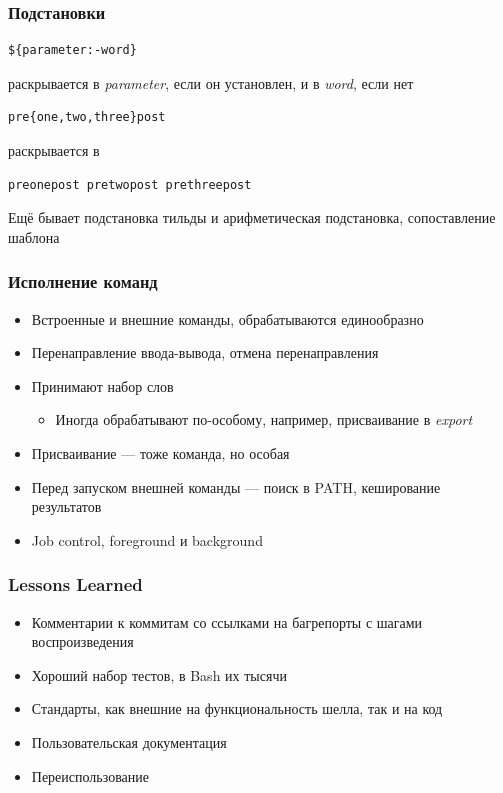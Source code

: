 \documentclass{../../slides-style}
\begin{document}
    \begin{frame}[fragile]
        \frametitle{Подстановки}
        \begin{verbatim}
${parameter:-word}
        \end{verbatim}

раскрывается в \textit{parameter}, если он установлен, и в \textit{word}, если нет

        \begin{verbatim}
pre{one,two,three}post
        \end{verbatim}

раскрывается в 

        \begin{verbatim}
preonepost pretwopost prethreepost
        \end{verbatim}

        Ещё бывает подстановка тильды и арифметическая подстановка, сопоставление шаблона
    \end{frame}

    \begin{frame}[fragile]
        \frametitle{Исполнение команд}
        \begin{itemize}
            \item Встроенные и внешние команды, обрабатываются единообразно
            \item Перенаправление ввода-вывода, отмена перенаправления
            \item Принимают набор слов
            \begin{itemize}
                \item Иногда обрабатывают по-особому, например, присваивание в \textit{export}
            \end{itemize}
            \item Присваивание --- тоже команда, но особая
            \item Перед запуском внешней команды --- поиск в PATH, кеширование результатов
            \item Job control, foreground и background
        \end{itemize}
    \end{frame}

    \begin{frame}[fragile]
        \frametitle{Lessons Learned}
        \begin{itemize}
            \item Комментарии к коммитам со ссылками на багрепорты с шагами воспроизведения
            \item Хороший набор тестов, в Bash их тысячи
            \item Стандарты, как внешние на функциональность шелла, так и на код
            \item Пользовательская документация
            \item Переиспользование
        \end{itemize}
    \end{frame}
\end{document}

